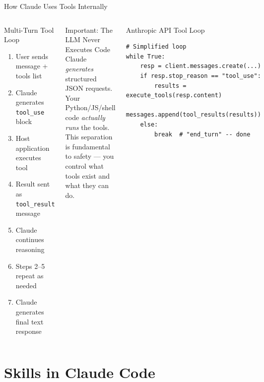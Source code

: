 \documentclass[aspectratio=169,xcolor=dvipsnames]{beamer}
\begin{document}
\begin{frame}[fragile]{How Claude Uses Tools Internally}
    \begin{columns}
        \begin{block}{Multi-Turn Tool Loop}
            \begin{enumerate}
                \item User sends message + tools list
                \item Claude generates \texttt{tool\_use} block
                \item Host application executes tool
                \item Result sent as \texttt{tool\_result} message
                \item Claude continues reasoning
                \item Steps 2--5 repeat as needed
                \item Claude generates final text response
            \end{enumerate}
        \end{block}

        \begin{alertblock}{Important: The LLM Never Executes Code}
            Claude \emph{generates} structured JSON requests. Your Python/JS/shell code \emph{actually runs} the tools. This separation is fundamental to safety --- you control what tools exist and what they can do.
        \end{alertblock}
        \vspace{0.2cm}
        \begin{exampleblock}{Anthropic API Tool Loop}
                        \begin{lstlisting}[style=PythonStyle]
# Simplified loop
while True:
    resp = client.messages.create(...)
    if resp.stop_reason == "tool_use":
        results = execute_tools(resp.content)
        messages.append(tool_results(results))
    else:
        break  # "end_turn" -- done
            \end{lstlisting}
        \end{exampleblock}
    \end{columns}
\end{frame}

\section{Skills in Claude Code}
\end{document}
